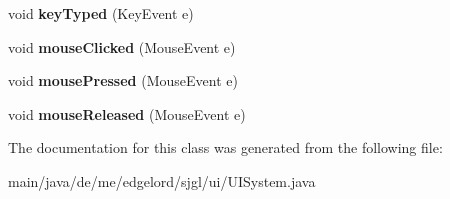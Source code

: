 \begin{DoxyCompactItemize}
void {\bfseries key\+Typed} (Key\+Event e)
\item 
\mbox{\label{classde_1_1me_1_1edgelord_1_1sjgl_1_1ui_1_1_u_i_system_ab23817e2e0d2b170f0747549a5d2b151}} 
void {\bfseries mouse\+Clicked} (Mouse\+Event e)
\item 
\mbox{\label{classde_1_1me_1_1edgelord_1_1sjgl_1_1ui_1_1_u_i_system_ac425d8dea6fe0bdb4c68330e4d806e51}} 
void {\bfseries mouse\+Pressed} (Mouse\+Event e)
\item 
\mbox{\label{classde_1_1me_1_1edgelord_1_1sjgl_1_1ui_1_1_u_i_system_a7b48024c3df509987bf4493547652128}} 
void {\bfseries mouse\+Released} (Mouse\+Event e)
\end{DoxyCompactItemize}


The documentation for this class was generated from the following file\+:\begin{DoxyCompactItemize}
\item 
main/java/de/me/edgelord/sjgl/ui/U\+I\+System.\+java\end{DoxyCompactItemize}
